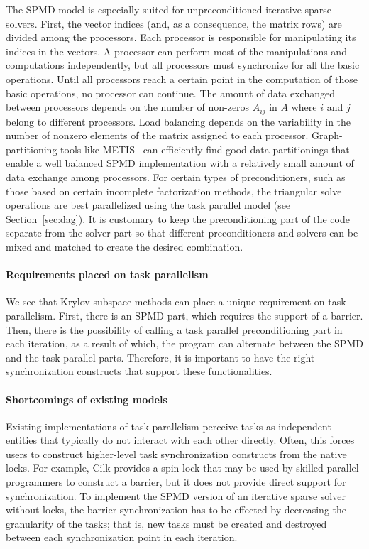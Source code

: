 \documentclass{sig-alternate}
\begin{document}
The SPMD model is especially suited for unpreconditioned iterative sparse
solvers.  First, the vector indices (and, as a consequence, the matrix rows)
are divided among the processors. Each processor is responsible for
manipulating its indices in the vectors. A processor can perform most of the
manipulations and computations independently, but all processors must
synchronize for all the basic operations.  Until all processors reach a certain
point in the computation of those basic operations, no processor can continue.
The amount of data exchanged between processors depends on the number of
non-zeros $A_{ij}$ in $A$ where $i$ and $j$ belong to different processors.
Load balancing depends on the variability in the number of nonzero elements of
the matrix assigned to each processor.  
Graph-partitioning tools like METIS~\cite{MetisPaper} can
efficiently find good data partitionings that enable a well balanced SPMD
implementation with a relatively small amount of data exchange among
processors.
%
For certain types of preconditioners, such as those based on certain incomplete
factorization methods, the triangular solve operations are best parallelized
using the task parallel model (see Section~\ref{sec:dag}).  It is customary to keep the preconditioning
part of the code separate from the solver part so that different
preconditioners and solvers can be mixed and matched to create the desired
combination.

\paragraph{Requirements placed on task parallelism}
We see that Krylov-subspace methods can place a unique requirement on task
parallelism. First, there is an SPMD part, which requires the support of a
barrier.  Then, there is the possibility of calling a task parallel
preconditioning part in each iteration, as a result of which, the program can
alternate between the SPMD and the task parallel parts.  Therefore, it is
important to have the right synchronization constructs that support these
functionalities.

\paragraph{Shortcomings of existing models}
Existing implementations of task parallelism perceive tasks as independent
entities that typically do not interact with each other directly.  Often, this
forces users to construct higher-level task synchronization constructs from the
native locks.  For example, Cilk provides a spin lock that may be used by
skilled parallel programmers to construct a barrier, but it does not provide
direct support for synchronization.  To implement the SPMD version of an
iterative sparse solver without locks, the barrier synchronization has to be effected
by decreasing the granularity of the tasks; that is, new tasks must be created
and destroyed between each synchronization point in each iteration.
\end{document}
